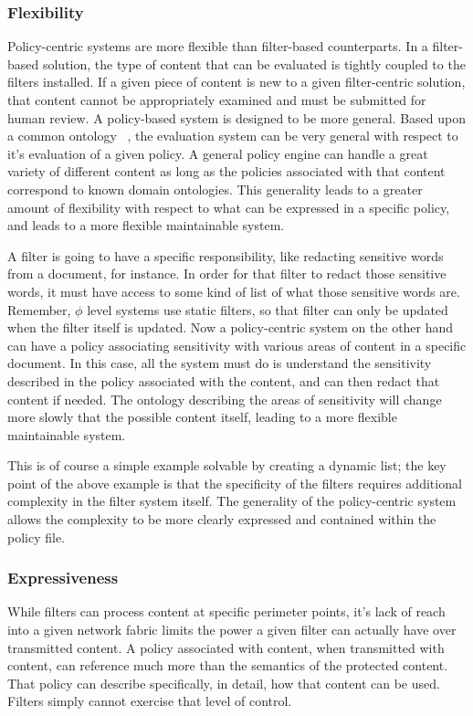 \subsubsection*{Flexibility}
Policy-centric systems are more flexible than filter-based counterparts.  In a filter-based solution, the type of content that can be evaluated is tightly coupled to the filters installed.  If a given piece of content is new to a given filter-centric solution, that content cannot be appropriately examined and must be submitted for human review.  A policy-based system is designed to be more general.  Based upon a common ontology ~\cite{JaHeLa:10}, the evaluation system can be very general with respect to it's evaluation of a given policy.  A general policy engine can handle a great variety of different content as long as the policies associated with that content correspond to known domain ontologies.  This generality leads to a greater amount of flexibility with respect to what can be expressed in a specific policy, and leads to a more flexible maintainable system.

A filter is going to have a specific responsibility, like redacting sensitive words from a document, for instance.  In order for that filter to redact those sensitive words, it must have access to some kind of list of what those sensitive words are.  Remember, $\phi$ level systems use static filters, so that filter can only be updated when the filter itself is updated.  Now a policy-centric system on the other hand can have a policy associating sensitivity with various areas of content in a specific document.  In this case, all the system must do is understand the sensitivity described in the policy associated with the content, and can then redact that content if needed.  The ontology describing the areas of sensitivity will change more slowly that the possible content itself, leading to a more flexible maintainable system.

This is of course a simple example solvable by creating a dynamic list; the key point of the above example is that the specificity of the filters requires additional complexity in the filter system itself.  The generality of the policy-centric system allows the complexity to be more clearly expressed and contained within the policy file.

\subsubsection*{Expressiveness}
While filters can process content at specific perimeter points, it's lack of reach into a given network fabric limits the power a given filter can actually have over transmitted content.  A policy associated with content, when transmitted with content, can reference much more than the semantics of the protected content.  That policy can describe specifically, in detail, how that content can be used.  Filters simply cannot exercise that level of control.

